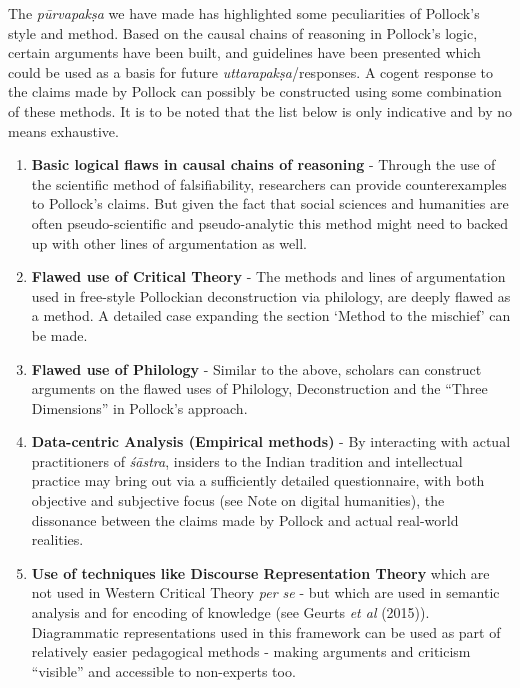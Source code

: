 The  {\sl pūrvapakṣa} we have made has highlighted some peculiarities of Pollock's style and method. Based on the causal chains of reasoning in Pollock's logic, certain arguments have been built, and guidelines have been presented which could be used as a basis for future {\sl uttarapakṣa}/responses. A cogent response to the claims made by Pollock can possibly be constructed using some combination of these methods. It is to be noted that the list below is only indicative and by no means exhaustive.
\begin{enumerate}
\item {\bf Basic logical flaws in causal chains of reasoning} - Through the use of the scientific method of falsifiability, researchers can provide counterexamples to Pollock's claims.  But given the fact that social sciences and humanities are often pseudo-scientific and pseudo-analytic this method might need to backed up with other lines of argumentation as well.

\item {\bf Flawed use of Critical Theory} - The methods and lines of argumentation used in free-style Pollockian deconstruction via philology, are deeply flawed as a method. A detailed case expanding the section `Method to the mischief' can be made. 

\item {\bf Flawed use of Philology} - Similar to the above, scholars can construct arguments on the flawed uses of Philology, Deconstruction and the ``Three Dimensions'' in Pollock's approach.

\item {\bf Data-centric Analysis (Empirical methods)} - By interacting with actual practitioners of {\sl śāstra}, insiders to the Indian tradition and intellectual practice may bring out via a sufficiently detailed questionnaire, with both objective and subjective focus (see Note on digital humanities), the dissonance between the claims made by Pollock and  actual real-world realities.

\item {\bf Use of techniques like Discourse Representation Theory} which are not used in Western Critical Theory {\sl per se} - but which are used in semantic analysis and for encoding of knowledge (see Geurts {\sl et al} (2015)). Diagrammatic representations used in this framework can be used as part of relatively easier pedagogical methods - making arguments and criticism ``visible'' and accessible to non-experts too.


\end{enumerate}
